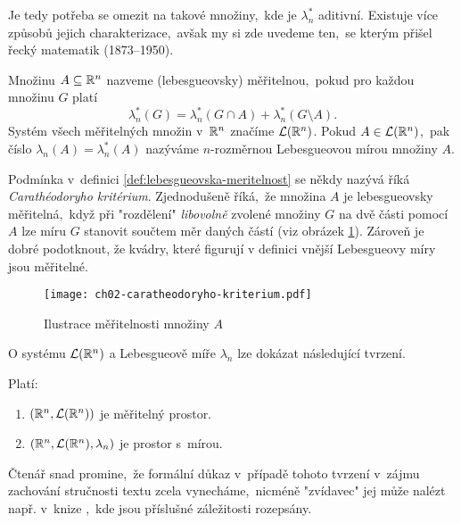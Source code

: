Je tedy potřeba se omezit na takové množiny,~kde je $\lambda_n^*$ aditivní. Existuje více způsobů jejich charakterizace,~avšak my si zde uvedeme ten,~se kterým přišel řecký matematik  (1873--1950).
\begin{definition}\label{def:lebesgueovska-meritelnost}
    Množinu $A\subseteq\mathbb{R}^n$ nazveme (lebesgueovsky) měřitelnou,~pokud pro každou množinu $G$ platí
    \[\lambda_n^*(G)=\lambda_n^*(G\cap A)+\lambda_n^*(G\setminus A).\]
    Systém všech měřitelných množin v~$\mathbb{R}^n$ značíme $\mathcal{L}(\mathbb{R}^n)$.  Pokud $A\in\mathcal{L}(\mathbb{R}^n)$,~pak číslo $\lambda_n(A)=\lambda_n^*(A)$ nazýváme $n$-rozměrnou Lebesgueovou mírou množiny $A$.
\end{definition}
Podmínka v~definici \ref{def:lebesgueovska-meritelnost} se někdy nazývá říká \emph{Carathéodoryho kritérium}. Zjednodušeně říká,~že množina $A$ je lebesgueovsky měřitelná,~když při "rozdělení" \emph{libovolně} zvolené množiny $G$ na dvě části pomocí $A$ lze míru $G$ stanovit součtem měr daných částí (viz obrázek \ref{fig:caratheodoryho-kriterium}). Zároveň je dobré podotknout, že kvádry, které figurují v definici vnější Lebesgueovy míry jsou měřitelné.
\begin{figure}[h]
    \centering
    \texttt{[image: ch02-caratheodoryho-kriterium.pdf]}
    \caption{Ilustrace měřitelnosti množiny $A$}
    \label{fig:caratheodoryho-kriterium}
\end{figure}
O systému $\mathcal{L}(\mathbb{R}^n)$ a Lebesgueově míře $\lambda_n$ lze dokázat následující tvrzení.
\begin{theorem}\label{thm:prostor-s-Lebesgueovou-mirou}
    Platí:
    \begin{enumerate}[label=(\roman*)]
        \item $(\mathbb{R}^n,\mathcal{L}(\mathbb{R}^n))$ je měřitelný prostor.
        \item $(\mathbb{R}^n,\mathcal{L}(\mathbb{R}^n),\lambda_n)$ je prostor s~mírou.
    \end{enumerate}
\end{theorem}
Čtenář snad promine,~že formální důkaz v~případě tohoto tvrzení v~zájmu zachování stručnosti textu zcela vynecháme,~nicméně "zvídavec" jej může nalézt např. v~knize \citep[str. 347]{Royden2010},~kde jsou příslušné záležitosti rozepsány.